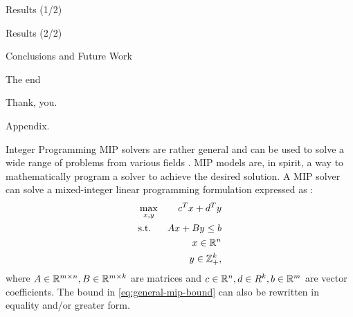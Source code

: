 \begin{frame}{Results (1/2)}

\end{frame}

\begin{frame}{Results (2/2)}

\end{frame}

\begin{frame}{Conclusions and Future Work}
	\cite{jepsen2014}
\end{frame}

\begin{frame}{The end}
	\begin{center}
		\begingroup
		\fontsize{18pt}{18pt}\selectfont
		Thank, you.
		\endgroup
	\end{center}
\end{frame}

\appendix

\begin{frame}
\end{frame}

\begin{frame}
	\begin{center}
		\begingroup
		\fontsize{18pt}{18pt}\selectfont
		Appendix.
		\endgroup
	\end{center}
\end{frame}

\begin{frame}{Integer Programming}
	MIP solvers are rather general and can be used to solve a wide range of problems from various fields \parencite{bixby2007progress}.
	MIP models are, in spirit, a way to mathematically program a solver to achieve the desired solution.
	A MIP solver can solve a mixed-integer linear programming formulation
	expressed as \parencite{wolsey1999integer}:
	\begin{align}
		 & \max_{x, y} & c^T x + d^T y                                 \\
		 & \text{s.t.} & A x + B y \le b  \label{eq:general-mip-bound} \\
		 &             & x \in \mathbb R^n                                    \\
		 &             & y \in \mathbb Z_{+}^k,
	\end{align}
	where $A \in \mathbb R^{m \times n}, B \in \mathbb R^{m \times k}$ are matrices and
	$c \in \mathbb R^n, d \in R^k, b \in \mathbb R^m$ are vector coefficients.
	The bound in \cref{eq:general-mip-bound} can also be rewritten in equality and/or greater form.

\end{frame}

